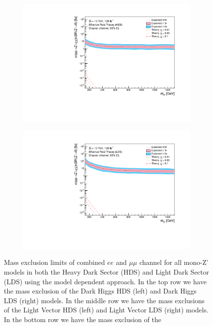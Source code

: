 \documentclass[12pt, a4paper]{book}
\begin{document}
\begin{figure}[!ht]
\begin{subfigure}[b]{0.49\textwidth}
      \includegraphics[width=1\textwidth]{Limits/EFT_HDS/mass_exclusion_comb.pdf}
   \end{subfigure}
   \hfill
   \begin{subfigure}[b]{0.49\textwidth}
      \centering
      \includegraphics[width=1\textwidth]{Limits/EFT_LDS/mass_exclusion_comb.pdf}
   \end{subfigure}
   \caption[Mass exclusion limits of combined $ee$ and $\mu\mu$ channel for all mono-Z' models using the model dependent approach]{Mass exclusion limits of combined $ee$ and $\mu\mu$ channel for all mono-Z' models in both the Heavy Dark Sector (HDS) and Light Dark Sector (LDS) using the model dependent approach. 
   In the top row we have the mass exclusion of the Dark Higgs HDS (left) and Dark Higgs LDS (right) models. In the middle row we have the mass exclusions of the Light Vector HDS (left) and Light Vector LDS (right) models. In the bottom row we have the mass exclusion of the 
}
\end{figure}
\end{document}
